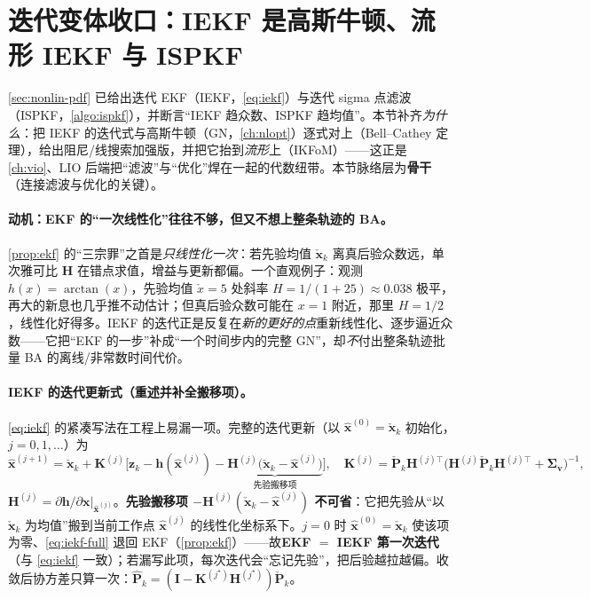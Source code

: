 \section{迭代变体收口：IEKF 是高斯牛顿、流形 IEKF 与 ISPKF}
\label{sec:iekf-gn}

\cref{sec:nonlin-pdf} 已给出迭代 EKF（IEKF，\cref{eq:iekf}）与迭代 sigma 点滤波（ISPKF，\cref{algo:ispkf}），并断言“IEKF 趋众数、ISPKF 趋均值”。本节补齐\emph{为什么}：把 IEKF 的迭代式与高斯牛顿（GN，\cref{ch:nlopt}）逐式对上（Bell--Cathey 定理），给出阻尼/线搜索加强版，并把它抬到\emph{流形}上（IKFoM）——这正是 \cref{ch:vio}、LIO 后端把“滤波”与“优化”焊在一起的代数纽带。本节脉络层为\textbf{骨干}（连接滤波与优化的关键）。

\paragraph{动机：EKF 的“一次线性化”往往不够，但又不想上整条轨迹的 BA。}
\cref{prop:ekf} 的“三宗罪”之首是\emph{只线性化一次}：若先验均值 $\check{\mathbf{x}}_k$ 离真后验众数远，单次雅可比 $\mathbf{H}$ 在错点求值，增益与更新都偏。一个直观例子：观测 $h(x)=\arctan(x)$，先验均值 $\check{x}=5$ 处斜率 $H=1/(1+25)\approx0.038$ 极平，再大的新息也几乎推不动估计；但真后验众数可能在 $x=1$ 附近，那里 $H=1/2$，线性化好得多\cite{barfoot2024state}。IEKF 的迭代正是反复在\emph{新的更好的点}重新线性化、逐步逼近众数——它把“EKF 的一步”补成“一个时间步内的完整 GN”，却\emph{不}付出整条轨迹批量 BA 的离线/非常数时间代价。

\paragraph{IEKF 的迭代更新式（重述并补全搬移项）。}
\cref{eq:iekf} 的紧凑写法在工程上易漏一项。完整的迭代更新（以 $\hat{\mathbf{x}}^{(0)}=\check{\mathbf{x}}_k$ 初始化，$j=0,1,\dots$）为\cite{barfoot2024state,bell1993iterated}
\begin{equation}
  \hat{\mathbf{x}}^{(j+1)}=\check{\mathbf{x}}_k+\mathbf{K}^{(j)}\Big[\mathbf{z}_k-\mathbf{h}(\hat{\mathbf{x}}^{(j)})-\underbrace{\mathbf{H}^{(j)}\big(\check{\mathbf{x}}_k-\hat{\mathbf{x}}^{(j)}\big)}_{\text{先验搬移项}}\Big],\quad
  \mathbf{K}^{(j)}=\check{\mathbf{P}}_k\mathbf{H}^{(j)\top}\big(\mathbf{H}^{(j)}\check{\mathbf{P}}_k\mathbf{H}^{(j)\top}+\boldsymbol{\Sigma}_{\mathbf{v}}\big)^{-1},
  \label{eq:iekf-full}
\end{equation}
$\mathbf{H}^{(j)}=\partial\mathbf{h}/\partial\mathbf{x}|_{\hat{\mathbf{x}}^{(j)}}$。\textbf{先验搬移项 $-\mathbf{H}^{(j)}(\check{\mathbf{x}}_k-\hat{\mathbf{x}}^{(j)})$ 不可省}：它把先验从“以 $\check{\mathbf{x}}_k$ 为均值”搬到当前工作点 $\hat{\mathbf{x}}^{(j)}$ 的线性化坐标系下。$j=0$ 时 $\hat{\mathbf{x}}^{(0)}=\check{\mathbf{x}}_k$ 使该项为零、\cref{eq:iekf-full} 退回 EKF（\cref{prop:ekf}）——故\textbf{EKF $=$ IEKF 第一次迭代}（与 \cref{eq:iekf} 一致）；若漏写此项，每次迭代会“忘记先验”，把后验越拉越偏。收敛后协方差只算一次：$\hat{\mathbf{P}}_k=(\mathbf{I}-\mathbf{K}^{(j^\star)}\mathbf{H}^{(j^\star)})\check{\mathbf{P}}_k$。

